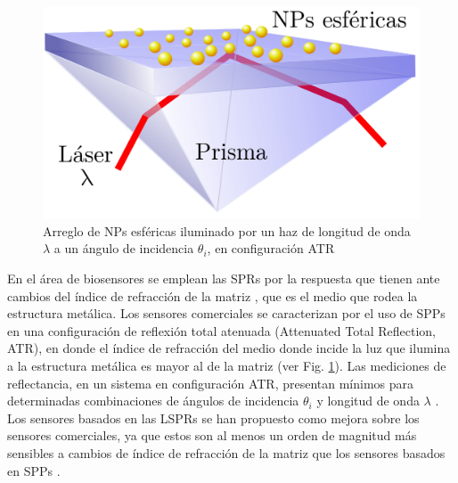 \begin{figure}\centering
	\includegraphics[scale=.18]{0-4-Introduccion/figs/CSM_3D-Prism_Text.png}
	\caption{ Arreglo de NPs esf\'ericas iluminado por un haz de longitud de onda $\lambda$ a un \'angulo de incidencia $\theta_i$, en configuraci\'on ATR}
	\label{fig:ATR1}
\end{figure}

En el área de biosensores se emplean las SPRs por la respuesta que tienen ante cambios del índice de refracción de la matriz \cite{kabashin2009plasmonic}, que es el medio que rodea la estructura metálica.  Los sensores comerciales se caracterizan por el uso de SPPs en una configuración de reflexión total atenuada (Attenuated Total Reflection, ATR), en donde el índice de refracción del medio donde incide la luz que ilumina a la estructura metálica es mayor al de la matriz (ver Fig.  \ref{fig:ATR1}).  Las mediciones de reflectancia, en un sistema en configuración ATR, presentan mínimos para determinadas combinaciones de  ángulos de incidencia $\theta_i$ y longitud de onda $\lambda$  \cite{danilov2018ultra}.  Los sensores basados en las LSPRs se han propuesto como mejora sobre los sensores comerciales, ya que estos son al menos un orden de magnitud más sensibles a cambios de índice de refracción de la matriz  que los sensores basados en SPPs \cite{jain2008noble,kabashin2009plasmonic}. 



